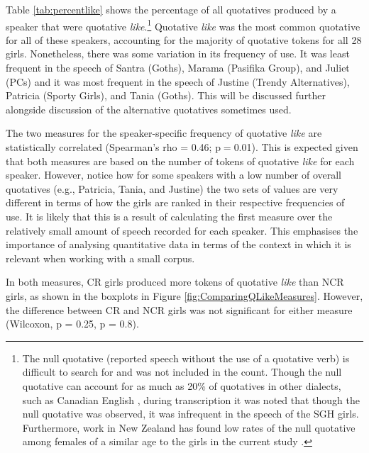 Table \ref{tab:percentlike} shows the percentage of all quotatives produced by a speaker that were quotative \textit{like}.\footnote{The null quotative (reported speech without the use of a quotative verb) is difficult to search for and was not included in the count.  Though the null quotative can account for as much as 20\% of quotatives in other dialects, such as Canadian English \cite{tagliamontehudson1999}, during transcription it was noted that though the null quotative was observed, it was infrequent in the speech of the SGH girls.  Furthermore, work in New Zealand has found low rates of the null quotative among females of a similar age to the girls in the current study \cite{buchstallerdarcy2009}.}  Quotative \textit{like} was the most common quotative for all of these speakers, accounting for the majority of quotative tokens for all 28 girls.  Nonetheless, there was some variation in its frequency of use.  It was least frequent in the speech of Santra (Goths), Marama (Pasifika Group), and Juliet (PCs) and it was most frequent in the speech of Justine (Trendy Alternatives), Patricia (Sporty Girls), and Tania (Goths).  This will be discussed further alongside discussion of the alternative quotatives sometimes used.


The two measures for the speaker-specific frequency of quotative \textit{like} are statistically correlated (Spearman's rho = 0.46; p$=$0.01).  This is expected given that both measures are based on the number of tokens of quotative \textit{like} for each speaker.  However, notice how for some speakers with a low number of overall quotatives (e.g., Patricia, Tania, and Justine) the two sets of values are very different in terms of how the girls are ranked in their respective frequencies of use. It is likely that this is a result of calculating the first measure over the relatively small amount of speech recorded for each speaker.  This emphasises the importance of analysing quantitative data in terms of the context in which it is relevant when working with a small corpus.  

In both measures, CR girls produced more tokens of quotative \textit{like} than NCR girls, as shown in the boxplots in Figure \ref{fig:ComparingQLikeMeasures}. However, the difference between CR and NCR girls was not significant for either measure (Wilcoxon, p = 0.25, p = 0.8).  

